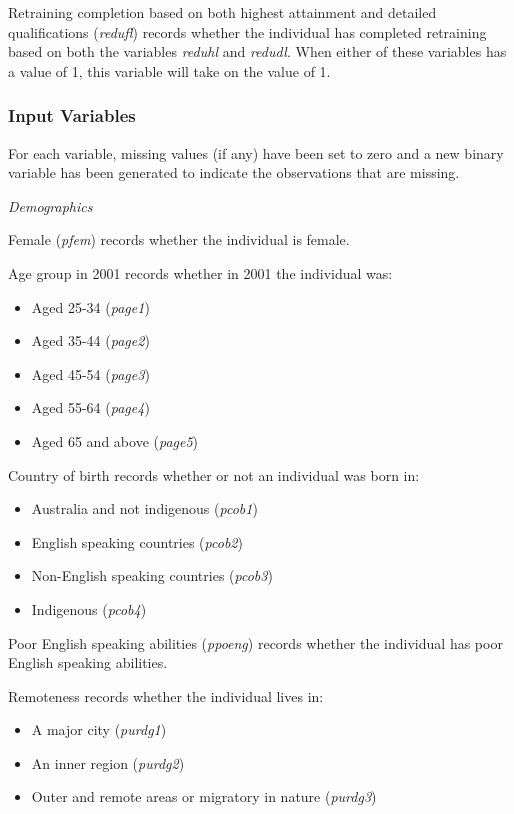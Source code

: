 \documentclass[12pt, a4paper]{article}
\begin{document}
Retraining completion based on both highest attainment and detailed qualifications (\textit{redufl}) records whether the individual has completed retraining based on both the variables \textit{reduhl} and \textit{redudl}. When either of these variables has a value of 1, this variable will take on the value of 1. 

\subsubsection{Input Variables}
For each variable, missing values (if any) have been set to zero and a new binary variable has been generated to indicate the observations that are missing. 

\emph{Demographics}

Female (\textit{p\textunderscore{}fem}) records whether the individual is female. 

Age group in 2001 records whether in 2001 the individual was:
\begin{itemize}
  \item Aged 25-34 (\textit{p\textunderscore{}age1})
  \item Aged 35-44 (\textit{p\textunderscore{}age2})
  \item Aged 45-54 (\textit{p\textunderscore{}age3})
  \item Aged 55-64 (\textit{p\textunderscore{}age4})
  \item Aged 65 and above (\textit{p\textunderscore{}age5})
 \end{itemize} 

Country of birth records whether or not an individual was born in:
\begin{itemize}
  \item Australia and not indigenous (\textit{p\textunderscore{}cob1}) 
  \item English speaking countries (\textit{p\textunderscore{}cob2})
  \item Non-English speaking countries (\textit{p\textunderscore{}cob3})
  \item Indigenous (\textit{p\textunderscore{}cob4})
\end{itemize}  
  
Poor English speaking abilities (\textit{p\textunderscore{}poeng}) records whether the individual has poor English speaking abilities. 

Remoteness records whether the individual lives in:
\begin{itemize}
  \item A major city (\textit{p\textunderscore{}urdg1})
  \item An inner region (\textit{p\textunderscore{}urdg2}) 
  \item Outer and remote areas or migratory in nature (\textit{p\textunderscore{}urdg3})
\end{itemize}  
  
\end{document}
